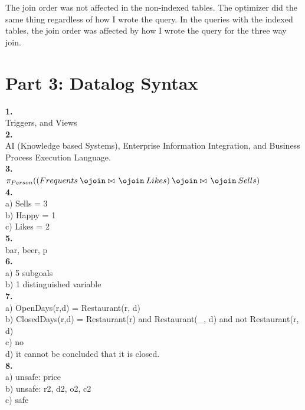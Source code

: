 \documentclass[12pt, letterpaper, fleqn]{article}
\def\join{\mathbin{\ojoin\mkern0mu\bowtie\mkern3mu\ojoin}}
\begin{document}
  The join order was not affected in the non-indexed tables. The optimizer did
  the same thing regardless of how I wrote the query. In the queries with the
  indexed tables, the join order was affected by how I wrote the query for the
  three way join.

  \section{Part 3: Datalog Syntax}
  \textbf{1.} \\
  Triggers, and Views\\

  \textbf{2.} \\
  AI (Knowledge based Systems), Enterprise Information Integration, and Business
  Process Execution Language.\\

  \textbf{3. }\\
  $\pi_{Person} ((Frequents \join Likes) \join Sells)$\\

  \textbf{4.} \\
  a) Sells  = 3\\
  b) Happy = 1\\
  c) Likes = 2 \\

  \textbf{5.} \\
  bar, beer, p\\

  \textbf{6.} \\
  a) 5 subgoals \\
  b) 1 distinguished variable\\

  \textbf{7.} \\
  a) OpenDays(r,d) = Restaurant(r, d) \\
  b) ClosedDays(r,d) = Restaurant(r) and Restaurant(\_, d) and not Restaurant(r, d)\\
  c) no\\
  d) it cannot be concluded that it is closed.\\

  \textbf{8.} \\
  a) unsafe: price \\
  b) unsafe: r2, d2, o2, c2\\
  c) safe
\end{document}
